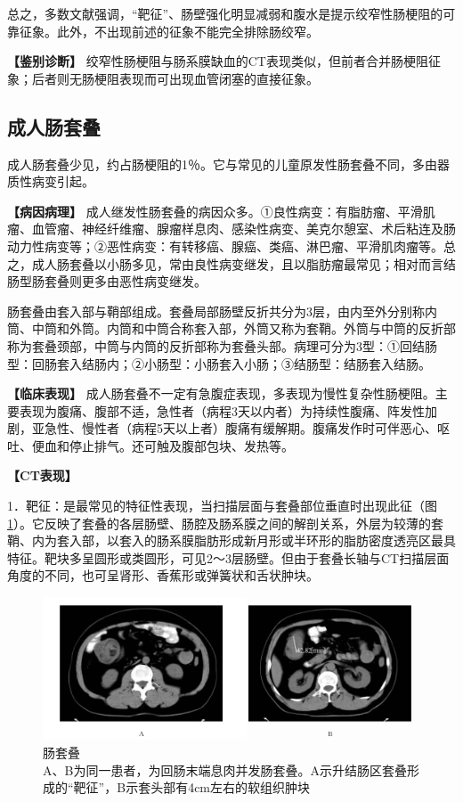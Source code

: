 总之，多数文献强调，“靶征”、肠壁强化明显减弱和腹水是提示绞窄性肠梗阻的可靠征象。此外，不出现前述的征象不能完全排除肠绞窄。

\textbf{【鉴别诊断】}
绞窄性肠梗阻与肠系膜缺血的CT表现类似，但前者合并肠梗阻征象；后者则无肠梗阻表现而可出现血管闭塞的直接征象。

\subsection{成人肠套叠}

成人肠套叠少见，约占肠梗阻的1％。它与常见的儿童原发性肠套叠不同，多由器质性病变引起。

\textbf{【病因病理】}
成人继发性肠套叠的病因众多。①良性病变：有脂肪瘤、平滑肌瘤、血管瘤、神经纤维瘤、腺瘤样息肉、感染性病变、美克尔憩室、术后粘连及肠动力性病变等；②恶性病变：有转移癌、腺癌、类癌、淋巴瘤、平滑肌肉瘤等。总之，成人肠套叠以小肠多见，常由良性病变继发，且以脂肪瘤最常见；相对而言结肠型肠套叠则更多由恶性病变继发。

肠套叠由套入部与鞘部组成。套叠局部肠壁反折共分为3层，由内至外分别称内筒、中筒和外筒。内筒和中筒合称套入部，外筒又称为套鞘。外筒与中筒的反折部称为套叠颈部，中筒与内筒的反折部称为套叠头部。病理可分为3型：①回结肠型：回肠套入结肠内；②小肠型：小肠套入小肠；③结肠型：结肠套入结肠。

\textbf{【临床表现】}
成人肠套叠不一定有急腹症表现，多表现为慢性复杂性肠梗阻。主要表现为腹痛、腹部不适，急性者（病程3天以内者）为持续性腹痛、阵发性加剧，亚急性、慢性者（病程5天以上者）腹痛有缓解期。腹痛发作时可伴恶心、呕吐、便血和停止排气。还可触及腹部包块、发热等。

\textbf{【CT表现】}

1．靶征：是最常见的特征性表现，当扫描层面与套叠部位垂直时出现此征（图\ref{fig17-17}）。它反映了套叠的各层肠壁、肠腔及肠系膜之间的解剖关系，外层为较薄的套鞘、内为套入部，以套入的肠系膜脂肪形成新月形或半环形的脂肪密度透亮区最具特征。靶块多呈圆形或类圆形，可见2～3层肠壁。但由于套叠长轴与CT扫描层面角度的不同，也可呈肾形、香蕉形或弹簧状和舌状肿块。

\begin{figure}[!htbp]
 \centering
 \includegraphics[width=.7\textwidth,height=\textheight,keepaspectratio]{./images/Image00369.jpg}
 \captionsetup{justification=centering}
 \caption{肠套叠\\{\small A、B为同一患者，为回肠末端息肉并发肠套叠。A示升结肠区套叠形成的“靶征”，B示套头部有4cm左右的软组织肿块}}
 \label{fig17-17}
  \end{figure} 

